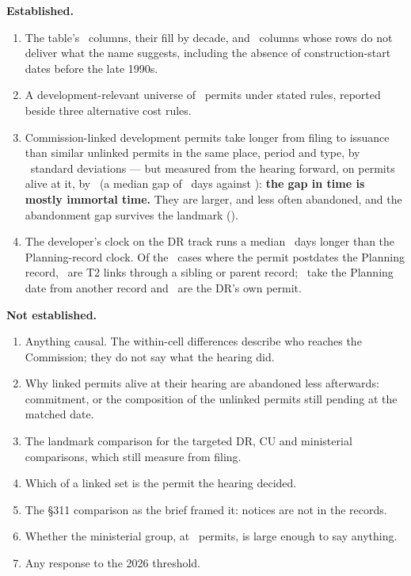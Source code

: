 \documentclass[11pt]{article}
\begin{document}
\textbf{Established.}
\begin{enumerate}
\item The table's \pcCols\ columns, their fill by decade, and \pcNoted\ columns whose rows do not
deliver what the name suggests, including the absence of construction-start dates before the
late 1990s.
\item A development-relevant universe of \pcUniverse\ permits under stated rules, reported
beside three alternative cost rules.
\item Commission-linked development permits take longer from filing to issuance than similar
unlinked permits in the same place, period and type, by \pcSdDaysCell\ standard deviations ---
but measured from the hearing forward, on permits alive at it, by \pcLmSdDays\ (a median gap
of \pcLmMedGap\ days against \pcCellMedGap): \textbf{the gap in time is mostly immortal time.} They are larger, and less often abandoned, and the
abandonment gap survives the landmark (\pcLmSdExit).
\item The developer's clock on the DR track runs a median \pcDrDiffMed\ days longer than the
Planning-record clock. Of the \pcDrNegN\ cases where the permit postdates the Planning record,
\pcDrNegStem\ are T2 links through a sibling or parent record; \pcDrNegRecord\ take the Planning
date from another record and \pcDrNegOwn\ are the DR's own permit.
\end{enumerate}

\textbf{Not established.}
\begin{enumerate}
\item Anything causal. The within-cell differences describe who reaches the Commission; they
do not say what the hearing did.
\item Why linked permits alive at their hearing are abandoned less afterwards: commitment, or
the composition of the unlinked permits still pending at the matched date.
\item The landmark comparison for the targeted DR, CU and ministerial comparisons, which still
measure from filing.
\item Which of a linked set is the permit the hearing decided.
\item The \S311 comparison as the brief framed it: notices are not in the records.
\item Whether the ministerial group, at \pcMinisterialPermits\ permits, is large enough to say
anything.
\item Any response to the 2026 threshold.
\end{enumerate}
\end{document}
